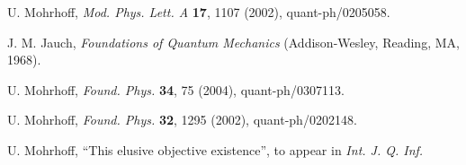 \documentclass[12pt]{article}
\begin{document}
\begin{thebibliography}{00}
U. Mohrhoff, {\it Mod. Phys. Lett. A\/} {\bf 17}, 1107 (2002), 
quant-ph/0205058.

J. M. Jauch, {\it Foundations of Quantum Mechanics\/} (Addison-Wesley, 
Reading, MA, 1968).

U. Mohrhoff, {\it Found. Phys.\/} {\bf 34}, 75 (2004), quant-ph/0307113.

U. Mohrhoff, {\it Found. Phys.\/} {\bf 32}, 1295 (2002), quant-ph/0202148.

U. Mohrhoff, ``This elusive objective existence'', to appear in {\it Int. J. Q. 
Inf.\/}

\end{thebibliography}
\end{document}
